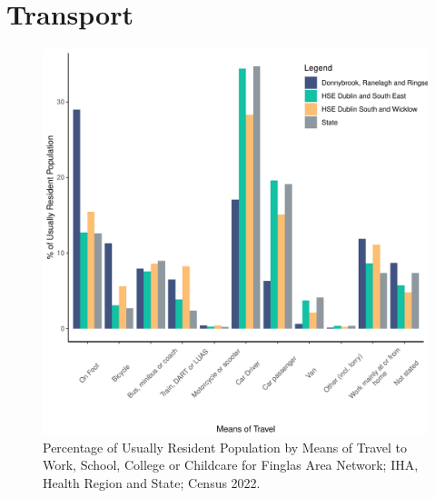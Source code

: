 \documentclass{article}
\begin{document}
\section{Transport}\label{sect:Trans}
\begin{figure}[H]
	\centering
	\includegraphics[width = 120mm]{../figures/TravelED.pdf}
	\caption{Percentage of Usually Resident Population by Means of Travel to Work, School, College or Childcare for Finglas Area Network; IHA, Health Region and State; Census 2022.}
	\label{fig:vbnv}
	\end{figure}
\end{document}
